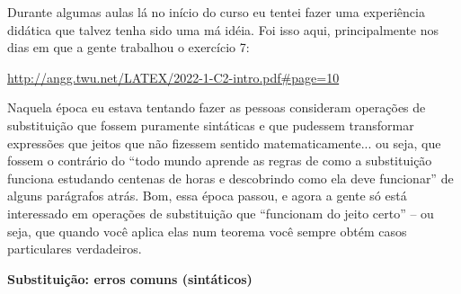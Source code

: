 \documentclass[oneside,12pt]{article}
\begin{document}
{{  \msk

  Durante algumas aulas lá no início do curso eu tentei fazer uma
  experiência didática que talvez tenha sido uma má idéia. Foi isso
  aqui, principalmente nos dias em que a gente trabalhou o exercício
  7:

  \ssk

  {\footnotesize

  \url{http://angg.twu.net/LATEX/2022-1-C2-intro.pdf\#page=10}

  }

  \ssk

  Naquela época eu estava tentando fazer as pessoas consideram
  operações de substituição que fossem puramente sintáticas e que
  pudessem transformar expressões que jeitos que não fizessem sentido
  matematicamente... ou seja, que fossem o contrário do ``todo mundo
  aprende as regras de como a substituição funciona estudando centenas
  de horas e descobrindo como ela deve funcionar'' de alguns
  parágrafos atrás. Bom, essa época passou, e agora a gente só está
  interessado em operações de substituição que ``funcionam do jeito
  certo'' -- ou seja, que quando você aplica elas num teorema você
  sempre obtém casos particulares verdadeiros.

}}



\newpage

{\bf Substituição: erros comuns (sintáticos)}
\end{document}
